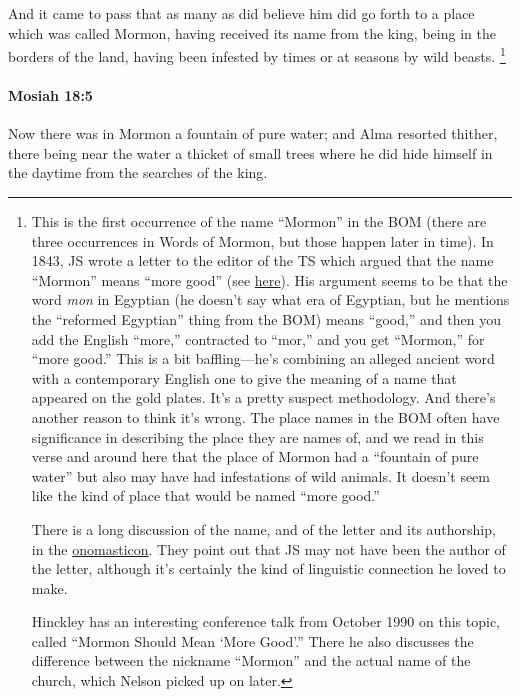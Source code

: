 			And it came to pass that
			as many as did believe him did go forth to a place which was called Mormon,
			having received its name from the king,
			being in the borders of the land,
			having been infested by times or at seasons by wild beasts.%
				\footnote{%
					\label{MOSIAH-18-4-NOTE-mormon}%
					This is the first occurrence of the name ``Mormon'' in the BOM (there are three occurrences in Words of Mormon, but those happen later in time). In 1843, JS wrote a letter to the editor of the TS which argued that the name ``Mormon'' means ``more good'' (see \hyperref[EMS-1843-JS-CIR-20-MAY-1843]{here}). His argument seems to be that the word \textit{mon} in Egyptian (he doesn't say what era of Egyptian, but he mentions the ``reformed Egyptian'' thing from the BOM) means ``good,'' and then you add the English ``more,'' contracted to ``mor,'' and you get ``Mormon,'' for ``more good.'' This is a bit baffling---he's combining an alleged ancient word with a contemporary English one to give the meaning of a name that appeared on the gold plates. It's a pretty suspect methodology. And there's another reason to think it's wrong. The place names in the BOM often have significance in describing the place they are names of, and we read in this verse and around here that the place of Mormon had a ``fountain of pure water'' but also may have had infestations of wild animals. It doesn't seem like the kind of place that would be named ``more good.''
					
					There is a long discussion of the name, and of the letter and its authorship, in the \href{https://onoma.lib.byu.edu/index.php/MORMON}{onomasticon}. They point out that JS may not have been the author of the letter, although it's certainly the kind of linguistic connection he loved to make.
					
					Hinckley has an interesting conference talk from October 1990 on this topic, called ``Mormon Should Mean `More Good'.'' There he also discusses the difference between the nickname ``Mormon'' and the actual name of the church, which Nelson picked up on later.
					}

		\paragraph{Mosiah 18:5} %
			\label{MOSIAH-18-5}

			Now there was in Mormon a fountain of pure water;
			and Alma resorted thither,
			there being near the water a thicket of small trees
			where he did hide himself in the daytime from the searches of the king.

